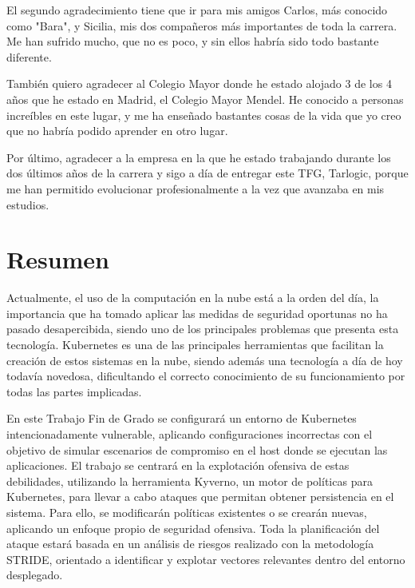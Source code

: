 \documentclass[12pt,twoside,titlepage]{report}
\newcommand\blankpage{%
    \newpage
    \null
    \thispagestyle{empty}%
    \newpage}
\begin{document}
El segundo agradecimiento tiene que ir para mis amigos Carlos, más conocido como "Bara", y Sicilia, mis dos compañeros más importantes de toda la carrera. Me han sufrido mucho, que no es poco, y sin ellos habría sido todo bastante diferente.

También quiero agradecer al Colegio Mayor donde he estado alojado 3 de los 4 años que he estado en Madrid, el Colegio Mayor Mendel. He conocido a personas increíbles en este lugar, y me ha enseñado bastantes cosas de la vida que yo creo que no habría podido aprender en otro lugar.

Por último, agradecer a la empresa en la que he estado trabajando durante los dos últimos años de la carrera y sigo a día de entregar este TFG, Tarlogic, porque me han permitido evolucionar profesionalmente a la vez que avanzaba en mis estudios.

\afterpage{\blankpage}








\chapter*{Resumen}

Actualmente, el uso de la computación en la nube está a la orden del día, la importancia que ha tomado aplicar las medidas de seguridad oportunas no ha pasado desapercibida, siendo uno de los principales problemas que presenta esta tecnología. Kubernetes es una de las principales herramientas que facilitan la creación de estos sistemas en la nube, siendo además una tecnología a día de hoy todavía novedosa, dificultando el correcto conocimiento de su funcionamiento por todas las partes implicadas.

En este Trabajo Fin de Grado se configurará un entorno de Kubernetes intencionadamente vulnerable, aplicando configuraciones incorrectas con el objetivo de simular escenarios de compromiso en el host donde se ejecutan las aplicaciones. El trabajo se centrará en la explotación ofensiva de estas debilidades, utilizando la herramienta Kyverno, un motor de políticas para Kubernetes, para llevar a cabo ataques que permitan obtener persistencia en el sistema. Para ello, se modificarán políticas existentes o se crearán nuevas, aplicando un enfoque propio de seguridad ofensiva. Toda la planificación del ataque estará basada en un análisis de riesgos realizado con la metodología STRIDE, orientado a identificar y explotar vectores relevantes dentro del entorno desplegado.
\end{document}
